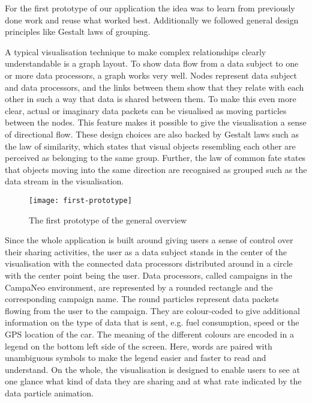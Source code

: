 \documentclass[../paper.tex]{subfiles}
\begin{document}
  For the first prototype of our application the idea was to learn from
  previously done work and reuse what worked best. Additionally we followed
  general design principles like Gestalt laws \cite{wiki:principles_of_grouping}
  of grouping.

  A typical visualisation technique to make complex relationships clearly
  understandable is a graph layout. To show data flow from a data subject to one
  or more data processors, a graph works very well. Nodes represent data
  subject and data processors, and the links between them show that they relate
  with each other in such a way that data is shared between them. To make this
  even more clear, actual or imaginary data packets can be visualised as moving
  particles between the nodes. This feature makes it possible to give the
  visualisation a sense of directional flow.
  These design choices are also backed by Gestalt laws such as the law of
  similarity, which states that visual objects resembling each other are
  perceived as belonging to the same group. Further, the law of common fate
  states that objects moving into the same direction are recognised as grouped
  such as the data stream in the visualisation.

  \begin{figure}
    \centering
    \texttt{[image: first-prototype]}
    \caption{The first prototype of the general overview}
    \label{fig:prototype}
  \end{figure}

  Since the whole application is built around giving users a sense of control
  over their sharing activities, the user as a data subject stands in the center of
  the visualisation with the connected data processors distributed around in a
  circle with the center point
  being the user. Data processors, called campaigns in the CampaNeo environment, are
  represented by a rounded rectangle and the corresponding campaign name. The round
  particles represent data packets flowing from the user to the campaign. They are
  colour-coded to give additional information on the type of data that is sent,
  e.g. fuel consumption, speed or the GPS location of the car.
  The meaning of the different colours are encoded in a legend on the bottom left
  side of the screen. Here, words are paired with unambiguous symbols to make the
  legend easier and faster to read and understand. On the whole, the visualisation
  is designed to enable users to see at one glance what kind of data they are sharing
  and at what rate indicated by the data particle animation.
\end{document}
